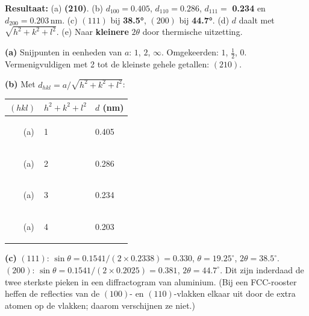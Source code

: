 \begin{oplossing}
\textbf{Resultaat:} (a) \textbf{(210)}. (b) \(d_{100} = 0.405\), \(d_{110} = 0.286\), \(d_{111} =\) \textbf{0.234} en \(d_{200} = 0.203\,\mathrm{nm}\). (c) \((111)\) bij \textbf{38.5°}, \((200)\) bij \textbf{44.7°}. (d) \(d\) daalt met \(\sqrt{h^2 + k^2 + l^2}\). (e) Naar \textbf{kleinere} \(2\theta\) door thermische uitzetting.

\textbf{(a)} Snijpunten in eenheden van \(a\): \(1\), \(2\), \(\infty\). Omgekeerden: \(1\), \(\tfrac{1}{2}\), \(0\). Vermenigvuldigen met 2 tot de kleinste gehele getallen: \((210)\).

\textbf{(b)} Met \(d_{hkl} = a/\sqrt{h^2 + k^2 + l^2}\):

\begin{center}
\begin{tabular}{lll}
\toprule
\((hkl)\) & \(h^2 + k^2 + l^2\) & \(d\) (nm) \\
\midrule
\begin{enumerate}
 \def\labelenumi{(\arabic{enumi})} \setcounter{enumi}{99}  \item[(a)] \end{enumerate} & 1 & 0.405 \\
\begin{enumerate}
 \def\labelenumi{(\arabic{enumi})} \setcounter{enumi}{109}  \item[(a)] \end{enumerate} & 2 & 0.286 \\
\begin{enumerate}
 \def\labelenumi{(\arabic{enumi})} \setcounter{enumi}{110}  \item[(a)] \end{enumerate} & 3 & 0.234 \\
\begin{enumerate}
 \def\labelenumi{(\arabic{enumi})} \setcounter{enumi}{199}  \item[(a)] \end{enumerate} & 4 & 0.203 \\
\bottomrule
\end{tabular}
\end{center}

\textbf{(c)} \((111)\): \(\sin\theta = 0.1541/(2 \times 0.2338) = 0.330\), \(\theta = 19.25^\circ\), \(2\theta = 38.5^\circ\). \((200)\): \(\sin\theta = 0.1541/(2 \times 0.2025) = 0.381\), \(2\theta = 44.7^\circ\). Dit zijn inderdaad de twee sterkste pieken in een diffractogram van aluminium. (Bij een FCC-rooster heffen de reflecties van de \((100)\)- en \((110)\)-vlakken elkaar uit door de extra atomen op de vlakken; daarom verschijnen ze niet.)


\end{oplossing}
